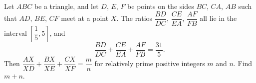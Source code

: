 Let $ABC$ be a triangle, and let $D$, $E$, $F$ be points on the sides $BC$, $CA$, $AB$ such that $AD$, $BE$, $CF$ meet at a point $X$. The ratios $\dfrac{BD}{DC}$, $\dfrac{CE}{EA}$, $\dfrac{AF}{FB}$ all lie in the interval $\left[\dfrac15,5\right]$, and
\[\dfrac{BD}{DC}+\dfrac{CE}{EA}+\dfrac{AF}{FB}=\dfrac{31}{5}.\]
Then $\dfrac{AX}{XD}+\dfrac{BX}{XE}+\dfrac{CX}{XF}=\dfrac mn$ for relatively prime positive integers $m$ and $n$. Find $m+n$.
